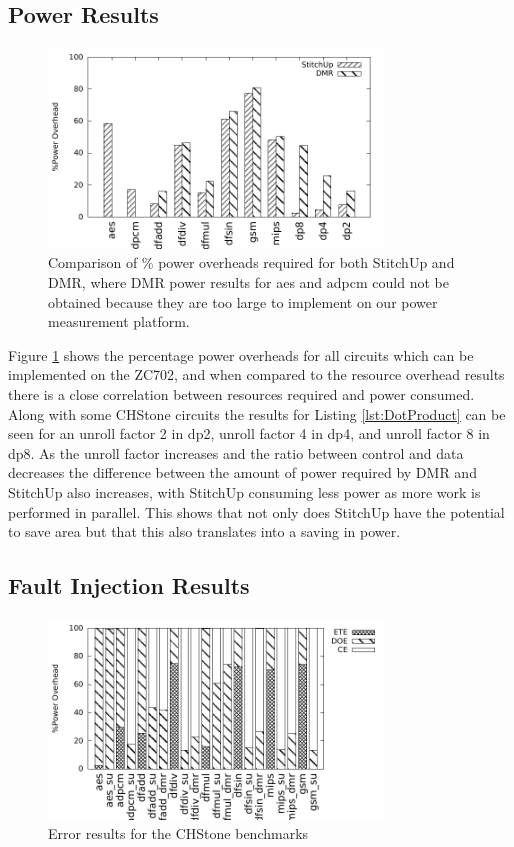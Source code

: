 \subsection{Power Results}
\begin{figure}[h]
\centering
\includegraphics[width=3.5in]{./graphs/power_results.pdf}
\caption{Comparison of \% power overheads required for both StitchUp and DMR, where DMR power results for aes and adpcm could
not be obtained because they are too large to implement on our power measurement platform.}
\label{fig:power_res}
\end{figure}

Figure \ref{fig:power_res} shows the percentage power overheads for all circuits which can be implemented on the ZC702,
and when compared to the resource overhead results there is a close correlation between resources required and power consumed.
Along with some CHStone circuits the results for Listing \ref{lst:DotProduct} can be seen for an unroll factor 2 in dp2, unroll factor 4 in dp4,
and unroll factor 8 in dp8.
As the unroll factor increases and the ratio between control and data decreases the difference between the amount of power required by DMR and StitchUp also
increases, with StitchUp consuming less power as more work is performed in parallel.
This shows that not only does StitchUp have the potential to save area but that this also translates into a
saving in power.

\subsection{Fault Injection Results}

\begin{figure}[h]
\centering
\includegraphics[width=3.5in]{./graphs/errors_res.pdf}
\caption{Error results for the CHStone benchmarks}
\label{fig:error_res}
\end{figure}

